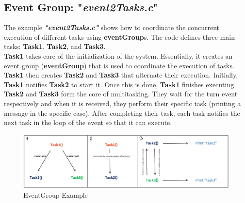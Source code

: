 \documentclass{article}
\begin{document}
\subsection{Event Group: "\textit{event2Tasks.c}"}
The example \textit{\textbf{"event2Tasks.c"}} shows how to coordinate the concurrent execution of different tasks using \textbf{eventGroup}s. The code defines three main tasks: \textbf{Task1}, \textbf{Task2}, and \textbf{Task3}.\\[0.1cm]
\textbf{Task1} takes care of the initialization of the system. Essentially, it creates an event group (\textbf{eventGroup}) that is used to coordinate the execution of tasks. \textbf{Task1} then creates \textbf{Task2} and \textbf{Task3} that alternate their execution. Initially, \textbf{Task1} notifies \textbf{Task2} to start it. Once this is done, \textbf{Task1} finishes executing.\\[0.1cm]
\textbf{Task2} and \textbf{Task3} form the core of multitasking. They wait for the turn event respectively and when it is received, they perform their specific task (printing a message in the specific case). After completing their task, each task notifies the next task in the loop of the event so that it can execute.
\begin{figure}[H]
    \centering
    \includegraphics[width=\linewidth]{EventGroup.png}
    \caption{EventGroup Example}
\end{figure}\noindent
\end{document}
